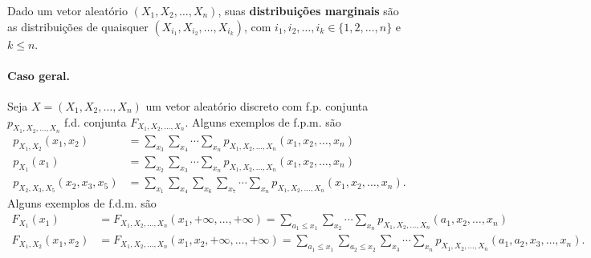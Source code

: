 \documentclass[../Notas.tex]{subfiles}
\begin{document}
\begin{definition}
Dado um vetor aleatório $(X_1, X_2, \dots, X_n)$, suas \textbf{distribuições marginais} são as distribuições de quaisquer $(X_{i_1}, X_{i_2}, \dots, X_{i_k})$, com $i_1, i_2, \dots, i_k\in\{ 1, 2, \dots, n \}$ e $k\leq n$.
\end{definition}

\paragraph{Caso geral.} Seja $X = (X_1, X_2, \dots, X_n)$ um vetor aleatório discreto com f.p. conjunta $p_{X_1, X_2, \dots, X_n}$ f.d. conjunta $F_{X_1, X_2, \dots, X_n}$. Alguns exemplos de f.p.m. são
\begin{align*}
    p_{X_1, X_2}(x_1, x_2) &= \sum_{x_3}\sum_{x_4}\cdots\sum_{x_n} p_{X_1, X_2, \dots, X_n}(x_1, x_2, \dots, x_n) \\
    p_{X_1}(x_1) &= \sum_{x_2}\sum_{x_3}\cdots\sum_{x_n} p_{X_1, X_2, \dots, X_n}(x_1, x_2, \dots, x_n) \\
    p_{X_2, X_3, X_5}(x_2, x_3, x_5) &= \sum_{x_1}\sum_{x_4}\sum_{x_6}\sum_{x_7}\cdots\sum_{x_n} p_{X_1, X_2, \dots, X_n}(x_1, x_2, \dots, x_n).
\end{align*}
Alguns exemplos de f.d.m. são
\begin{align*}
    F_{X_1}(x_1) &= F_{X_1, X_2, \dots, X_n}(x_1, +\infty, \dots, +\infty) = \sum_{a_1\leq x_1}\sum_{x_2}\cdots\sum_{x_n}p_{X_1, X_2, \dots, X_n}(a_1, x_2, \dots, x_n) \\
    F_{X_1, X_2}(x_1, x_2) &= F_{X_1, X_2, \dots, X_n}(x_1, x_2, +\infty, \dots, +\infty) = \sum_{a_1\leq x_1}\sum_{a_2\leq x_2}\sum_{x_3}\cdots\sum_{x_n}p_{X_1, X_2, \dots, X_n}(a_1, a_2, x_3, \dots, x_n).
\end{align*}
\end{document}
